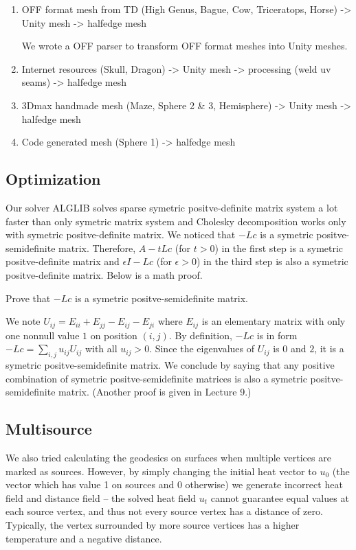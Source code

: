\documentclass[a4paper,12pt,twoside]{article}
\begin{document}
\begin{enumerate}

\item
OFF format mesh from TD (High Genus, Bague, Cow, Triceratops, Horse) -> Unity mesh -> halfedge mesh

We wrote a OFF parser to transform OFF format meshes into Unity meshes.

\item
Internet resources (Skull, Dragon) -> Unity mesh -> processing (weld uv seams) -> halfedge mesh

\item
3Dmax handmade mesh (Maze, Sphere 2 \& 3, Hemisphere) -> Unity mesh -> halfedge mesh

\item
Code generated mesh (Sphere 1) -> halfedge mesh

\end{enumerate}

\subsection{Optimization}
Our solver ALGLIB solves sparse symetric positve-definite matrix system a lot faster than only symetric matrix system and Cholesky decomposition works only with symetric positve-definite matrix.
We noticed that $-Lc$ is a symetric positve-semidefinite matrix.
Therefore, $A-tLc$ (for $t>0$) in the first step is a symetric positve-definite matrix and $\epsilon I-Lc$ (for $\epsilon >0$) in the third step is also a symetric positve-definite matrix. Below is a math proof.

Prove that $-Lc$ is a symetric positve-semidefinite matrix.

We note $U_{ij}=E_{ii}+E_{jj}-E_{ij}-E_{ji}$ where $E_{ij}$ is an elementary matrix with only one nonnull value $1$ on position $(i,j)$. By definition, $-Lc$ is in form  $-Lc=\sum_{i,j}u_{ij}U_{ij}$ with all $u_{ij}>0$. Since the eigenvalues of $U_{ij}$ is $0$ and $2$, it is a symetric positve-semidefinite matrix. We conclude by saying that any positive combination of symetric positve-semidefinite matrices is also a symetric positve-semidefinite matrix. (Another proof is given in Lecture 9.)\\

\subsection{Multisource}

We also tried calculating the geodesics on surfaces when multiple vertices are marked as sources. However, by simply changing the initial heat vector to  $u_0$ (the vector which has value 1 on sources and 0 otherwise) we generate incorrect heat field and distance field – the solved heat field $u_t$ cannot guarantee equal values at each source vertex, and thus not every source vertex has a distance of zero. Typically, the vertex surrounded by more source vertices has a higher temperature and a negative distance.
\end{document}
